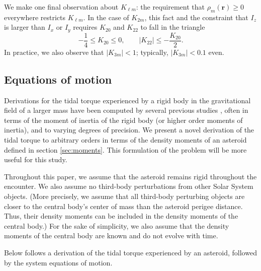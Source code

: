\documentclass[fleqn,usenatbib]{mnras}
\begin{document}
We make one final observation about $K_{\ell m}$: the requirement that $\rho_m(\bm r) \geq 0$ everywhere restricts $K_{\ell m}$. In the case of $K_{2m}$, this fact and the constraint that $I_z$ is larger than $I_x$ or $I_y$ requires $K_{20}$ and $K_{22}$ to fall in the triangle
\begin{equation}
  -\frac{1}{4} \leq K_{20} \leq 0, \qquad |K_{22}| \leq -\frac{K_{20}}{2}.
  \label{eqn:parameter-bounds}
\end{equation}
In practice, we also observe that $|K_{3m}| < 1$; typically, $|K_{3m}| < 0.1$ even.





\subsection{Equations of motion}
\label{sec:eom}

Derivations for the tidal torque experienced by a rigid body in the gravitational field of a larger mass have been computed by several previous studies \cite{paul88,HouMar2017,BOUE2009750, ashenberg07}, often in terms of the moment of inertia of the rigid body (or higher order moments of inertia), and to varying degrees of precision. We present a novel derivation of the tidal torque to arbitrary orders in terms of the density moments of an asteroid defined in section \ref{sec:moments}. This formulation of the problem will be more useful for this study.

Throughout this paper, we assume that the asteroid remains rigid throughout the encounter. We also assume no third-body perturbations from other Solar System objects. (More precisely, we assume that all third-body perturbing objects are closer to the central body's center of mass than the asteroid perigee distance. Thus, their density moments can be included in the density moments of the central body.) For the sake of simplicity, we also assume that the density moments of the central body are known and do not evolve with time.

Below follows a derivation of the tidal torque experienced by an asteroid, followed by the system equations of motion.
\end{document}
